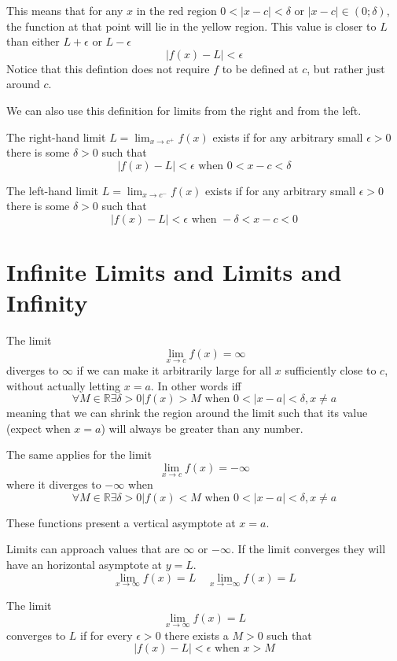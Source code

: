 \documentclass{article}
\begin{document}
This means that for any \(x\) in the red region \(0<|x-c|<\delta\text{ or }|x-c|\in (0; \delta)\),
the function at that point will lie in the yellow region.
This value is closer to \(L\) than either \(L + \epsilon\) or \(L - \epsilon\)
\[
    |f(x) - L| < \epsilon
\]
Notice that this defintion does not require \(f\) to be defined at \(c\), but rather just around \(c\).

We can also use this definition for limits from the right and from the left.

The right-hand limit \(L=\lim_{x\to c^{+}}f(x)\) exists if for any arbitrary small \(\epsilon > 0\)
there is some \(\delta > 0\) such that
\[
    |f(x)-L|<\epsilon \text{ when } 0 < x-c < \delta
\]

The left-hand limit \(L=\lim_{x\to c^{-}}f(x)\) exists if for any arbitrary small \(\epsilon > 0\)
there is some \(\delta > 0\) such that
\[
    |f(x)-L|<\epsilon \text{ when } -\delta < x-c < 0
\]

\pagebreak

\section{Infinite Limits and Limits and Infinity}

The limit
\[
    \lim_{x\to c}f(x) = \infty
\]
diverges to \(\infty\) if we can make it arbitrarily large for all \(x\)
sufficiently close to \(c\), without actually letting \(x=a\).
In other words iff
\[
    \forall M \in \mathbb{R} \exists \delta > 0 | f(x) > M \text{ when } 0<|x-a|<\delta, x \neq a
\]
meaning that we can shrink the region around the limit such that its value (expect when \(x=a\))
will always be greater than any number.

The same applies for the limit
\[
    \lim_{x\to c}f(x) = -\infty
\]
where it diverges to \(-\infty\) when
\[
    \forall M \in \mathbb{R} \exists \delta > 0 | f(x) < M \text{ when } 0<|x-a|<\delta, x \neq a
\]

These functions present a vertical asymptote at \(x=a\).

Limits can approach values that are \(\infty\) or \(-\infty\).
If the limit converges they will have an horizontal asymptote at \(y=L\).
\[
    \lim_{x \to \infty} f(x) = L
    \quad
    \lim_{x \to -\infty} f(x) = L
\]

The limit
\[
    \lim_{x \to \infty} f(x)=L
\]
converges to \(L\) if for every \(\epsilon > 0\) there exists a \(M > 0\) such that
\[
    |f(x)-L| < \epsilon \text{ when } x > M
\]
\end{document}
